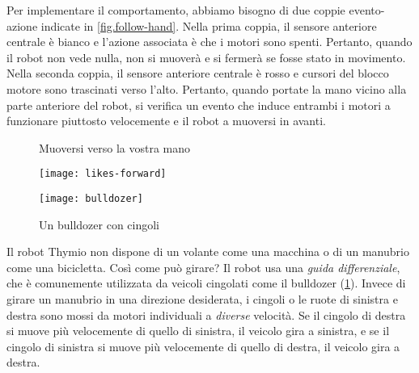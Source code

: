 \label {page.sensors}

Per implementare il comportamento, abbiamo bisogno di due coppie evento-azione indicate in
\cref{fig.follow-hand}. Nella prima coppia, il sensore anteriore centrale
è bianco e l'azione associata è che i motori sono spenti.
Pertanto, quando il robot non vede nulla, non si muoverà e
si fermerà se fosse stato in movimento. Nella seconda coppia, il sensore anteriore centrale è rosso e cursori del blocco motore sono trascinati verso l'alto.
Pertanto, quando portate la mano vicino alla parte anteriore del robot, si verifica un evento che induce entrambi i motori a funzionare piuttosto velocemente e il robot a muoversi in avanti.

\begin{figure}
\begin{floatrow}
	\ffigbox
	{\caption{Muoversi verso la vostra mano}\label{fig.follow-hand}}
	{\texttt{[image: likes-forward]}}
	\ffigbox
	{\caption{Un bulldozer con cingoli}\label{fig.bull}}
	{\texttt{[image: bulldozer]}}
\end{floatrow}
\end{figure}



Il robot Thymio non dispone di un volante come una macchina o di un
manubrio come una bicicletta. Così come può girare? Il robot usa una
\emph{guida differenziale}, che è comunemente utilizzata da veicoli cingolati come il
bulldozer (\cref{fig.bull}). Invece di girare un manubrio in una
direzione desiderata, i cingoli o le ruote di sinistra e destra sono mossi da
motori individuali a \emph{diverse} velocità. Se il cingolo di destra si muove
più velocemente di quello di sinistra, il veicolo gira a sinistra, e se il cingolo di sinistra
si muove più velocemente di quello di destra, il veicolo gira a destra.

